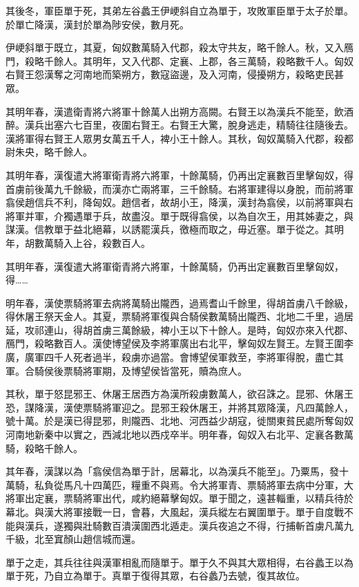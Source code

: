 \begin{pinyinscope}
其後冬，軍臣單于死，其弟左谷蠡王伊峺斜自立為單于，攻敗軍臣單于太子於單。於單亡降漢，漢封於單為陟安侯，數月死。

伊峺斜單于既立，其夏，匈奴數萬騎入代郡，殺太守共友，略千餘人。秋，又入鴈門，殺略千餘人。其明年，又入代郡、定襄、上郡，各三萬騎，殺略數千人。匈奴右賢王怨漢奪之河南地而築朔方，數寇盜邊，及入河南，侵擾朔方，殺略吏民甚眾。

其明年春，漢遣衛青將六將軍十餘萬人出朔方高闕。右賢王以為漢兵不能至，飲酒醉。漢兵出塞六七百里，夜圍右賢王。右賢王大驚，脫身逃走，精騎往往隨後去。漢將軍得右賢王人眾男女萬五千人，裨小王十餘人。其秋，匈奴萬騎入代郡，殺都尉朱央，略千餘人。

其明年春，漢復遣大將軍衛青將六將軍，十餘萬騎，仍再出定襄數百里擊匈奴，得首虜前後萬九千餘級，而漢亦亡兩將軍，三千餘騎。右將軍建得以身脫，而前將軍翕侯趙信兵不利，降匈奴。趙信者，故胡小王，降漢，漢封為翕侯，以前將軍與右將軍并軍，介獨遇單于兵，故盡沒。單于既得翕侯，以為自次王，用其姊妻之，與謀漢。信教單于益北絕幕，以誘罷漢兵，徼極而取之，毋近塞。單于從之。其明年，胡數萬騎入上谷，殺數百人。

其明年春，漢復遣大將軍衛青將六將軍，十餘萬騎，仍再出定襄數百里擊匈奴，得……

明年春，漢使票騎將軍去病將萬騎出隴西，過焉耆山千餘里，得胡首虜八千餘級，得休屠王祭天金人。其夏，票騎將軍復與合騎侯數萬騎出隴西、北地二千里，過居延，攻祁連山，得胡首虜三萬餘級，裨小王以下十餘人。是時，匈奴亦來入代郡、鴈門，殺略數百人。漢使博望侯及李將軍廣出右北平，擊匈奴左賢王。左賢王圍李廣，廣軍四千人死者過半，殺虜亦過當。會博望侯軍救至，李將軍得脫，盡亡其軍。合騎侯後票騎將軍期，及博望侯皆當死，贖為庶人。

其秋，單于怒昆邪王、休屠王居西方為漢所殺虜數萬人，欲召誅之。昆邪、休屠王恐，謀降漢，漢使票騎將軍迎之。昆邪王殺休屠王，并將其眾降漢，凡四萬餘人，號十萬。於是漢已得昆邪，則隴西、北地、河西益少胡寇，徙關東貧民處所奪匈奴河南地新秦中以實之，西減北地以西戍卒半。明年春，匈奴入右北平、定襄各數萬騎，殺略千餘人。

其年春，漢謀以為「翕侯信為單于計，居幕北，以為漢兵不能至」。乃粟馬，發十萬騎，私負從馬凡十四萬匹，糧重不與焉。令大將軍青、票騎將軍去病中分軍，大將軍出定襄，票騎將軍出代，咸約絕幕擊匈奴。單于聞之，遠甚輜重，以精兵待於幕北。與漢大將軍接戰一日，會暮，大風起，漢兵縱左右翼圍單于。單于自度戰不能與漢兵，遂獨與壯騎數百潰漢圍西北遁走。漢兵夜追之不得，行捕斬首虜凡萬九千級，北至窴顏山趙信城而還。

單于之走，其兵往往與漢軍相亂而隨單于。單于久不與其大眾相得，右谷蠡王以為單于死，乃自立為單于。真單于復得其眾，右谷蠡乃去號，復其故位。


\end{pinyinscope}
